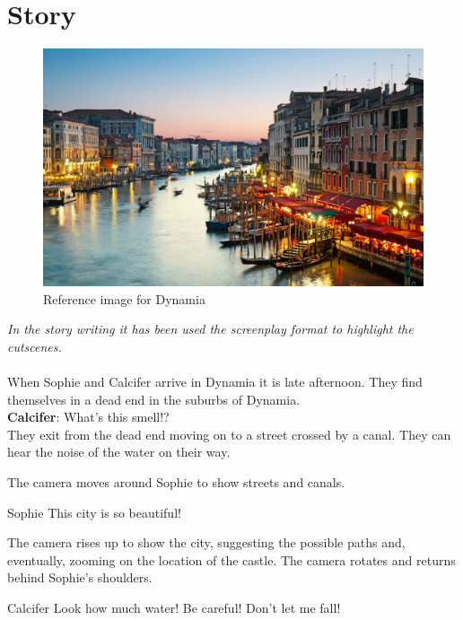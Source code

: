 \section{Story}

\begin{center}
  \begin{figure}[H]
    \centering
    \includegraphics[width=\textwidth]{../../References/Images/Dynamia/venice-restaurants-by-canal}
    \caption{Reference image for Dynamia}
  \end{figure}
\end{center}
\newpage
\noindent \textit{In the story writing it has been used the screenplay format to highlight the cutscenes.}\\\\

\noindent When Sophie and Calcifer arrive in Dynamia it is late afternoon. They find themselves in a dead end in the suburbs of Dynamia.\\

\textbf{Calcifer}: What’s this smell!?\\

\noindent They exit from the dead end moving on to a street crossed by a canal. They can hear the noise of the water on their way.

\begin{screenplay}

The camera  moves around Sophie to show streets and canals. 

\begin{dialogue}[amazed]{Sophie}
This city is so beautiful!
\end{dialogue}

The camera rises up to show the city, suggesting the possible paths and, eventually,  zooming on the location of the castle. The camera rotates and returns behind Sophie's shoulders. 

\begin{dialogue}[worried]{Calcifer}
Look how much water! Be careful! Don’t let me fall!
\end{dialogue}
\end{screenplay}

